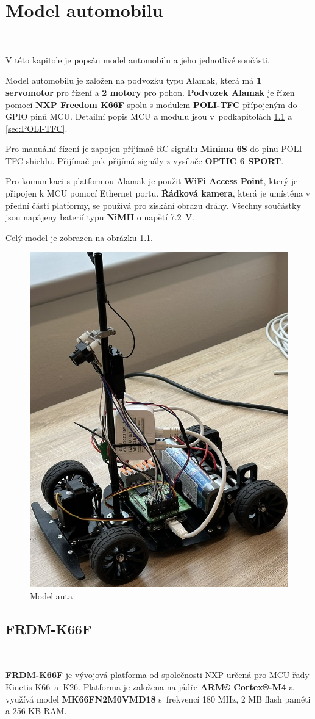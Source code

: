 \chapter{Model automobilu}
\label{sec:CarModel}
\

V této kapitole je popsán model automobilu a jeho jednotlivé součásti.

Model automobilu je založen na podvozku typu Alamak, která má \textbf{1 servomotor}
pro řízení a \textbf{2 motory} pro pohon.
\textbf{Podvozek Alamak} je řízen pomocí \textbf{NXP Freedom K66F} \cite{frdmk66UserGuide} spolu s modulem \textbf{POLI-TFC} přípojeným do GPIO pinů
MCU. Detailní popis MCU a modulu jsou v~podkapitolách \ref{sec:FRDM-K66F}
a \ref{sec:POLI-TFC}.

Pro manuální řízení je zapojen přijímač RC signálu \textbf{Minima 6S} do pinu
POLI-TFC shieldu. Přijímač pak přijímá signály z vysílače \textbf{OPTIC 6 SPORT}.

Pro komunikaci s platformou Alamak je použit \textbf{WiFi Access Point}, který je
připojen k MCU pomocí Ethernet portu. \textbf{Řádková kamera}, která je umístěna
v přední části platformy, se používá pro získání obrazu dráhy. Všechny součástky
jsou napájeny baterií typu \textbf{NiMH} o napětí 7.2~V.

Celý model je zobrazen na obrázku \ref{fig:car}.
\begin{figure}[!h]
    \centering
    \includegraphics[width = .4\linewidth]{Figures/Car.jpeg}
    \caption{Model auta}
    \label{fig:car}
\end{figure}

\section{FRDM-K66F}
\label{sec:FRDM-K66F}\

\textbf{FRDM-K66F} je vývojová platforma od společnosti NXP určená pro MCU řady Kinetis
K66~a~K26. Platforma je založena na jádře \textbf{ARM© Cortex®-M4} a využívá model
\textbf{MK66FN2M0VMD18} s~frekvencí 180 MHz, 2 MB flash paměti a 256 KB RAM.

